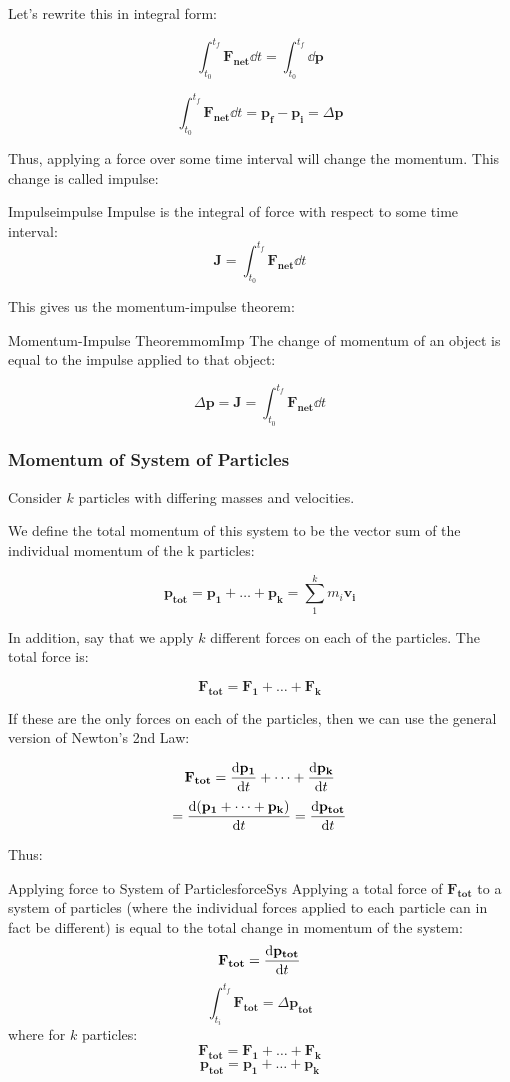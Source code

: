 \documentclass{report}
\begin{document}
Let's rewrite this in integral form:

$$\int_{t_0}^{t_f}\mathbf{F_{net}}\dd t = \int_{t_0}^{t_f}\dd \mathbf{p} $$

$$\int_{t_0}^{t_f}\mathbf{F_{net}}\dd t = \mathbf{p_f} - \mathbf{p_i} = \Delta \mathbf{p}$$


Thus, applying a force over some time interval will change the momentum. This change is called impulse:

\begin{mytheo}{Impulse}{impulse}
    Impulse is the integral of force with respect to some time interval:
    $$\mathbf{J} = \int_{t_0}^{t_f}\mathbf{F_{net}}\dd t$$
\end{mytheo}

This gives us the momentum-impulse theorem:
\begin{mytheo}{Momentum-Impulse Theorem}{momImp}
    The change of momentum of an object is equal to the impulse applied to that object:
    
    $$\Delta \mathbf{p} = \mathbf{J} = \int_{t_0}^{t_f}\mathbf{F_{net}}\dd t$$
    
\end{mytheo}

\subsubsection{Momentum of System of Particles}

Consider $k$ particles with differing masses and velocities.

We define the total momentum of this system to be the vector sum of the individual momentum of the k particles:

$$\mathbf{p_{tot}} = \mathbf{p_1} + \dots + \mathbf{p_k} = \sum_1^k m_i\mathbf{v_i}$$

In addition, say that we apply $k$ different forces on each of the particles. The total force is:

$$\mathbf{F_{tot}} = \mathbf{F_1} + \dots + \mathbf{F_k}$$

If these are the only forces on each of the particles, then we can use the general version of Newton's 2nd Law:

$$\mathbf{F_{tot}} = \dv{\mathbf{p_1}}{t} + \dots + \dv{\mathbf{p_k}}{t}$$
$$=\dv{(\mathbf{p_1} + \dots + \mathbf{p_k})}{t} = \dv{\mathbf{p_{tot}}}{t}$$

Thus:

\begin{mytheo}{Applying force to System of Particles}{forceSys}
    Applying a total force of $\mathbf{F_{tot}}$ to a system of particles (where the individual forces applied to each particle can in fact be different) is equal to the total change in momentum of the system:
    $$\mathbf{F_{tot}} =\dv{\mathbf{p_{tot}}}{t}$$
    $$\int_{t_i}^{t_f}\mathbf{F_{tot}} = \Delta\mathbf{p_{tot}}$$
    where for $k$ particles:
    $$\mathbf{F_{tot}} = \mathbf{F_1} + \dots + \mathbf{F_k}$$
    $$\mathbf{p_{tot}} = \mathbf{p_1} + \dots + \mathbf{p_k}$$

\end{mytheo}
\end{document}
